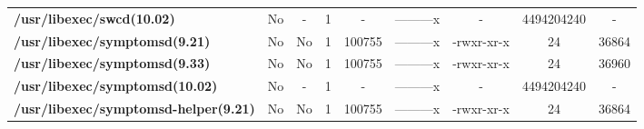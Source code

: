 \begin{center}
{\begin{tabular}{|>{\bfseries} l | C | C | C | C | C | C | C | C |}
					/usr/libexec/swcd(10.02) & No & - & 1 & - & ---------x & - & 4494204240 & -\\ 
					/usr/libexec/symptomsd(9.21) & No & No & \color{green}1 & \color{red}100755 & \color{green}---------x & \color{red}-rwxr-xr-x & \color{green}24 & \color{red}36864\\ 
					/usr/libexec/symptomsd(9.33) & No & No & \color{green}1 & \color{red}100755 & \color{green}---------x & \color{red}-rwxr-xr-x & \color{green}24 & \color{red}36960\\ 
					/usr/libexec/symptomsd(10.02) & No & - & 1 & - & ---------x & - & 4494204240 & -\\ 
					/usr/libexec/symptomsd-helper(9.21) & No & No & \color{green}1 & \color{red}100755 & \color{green}---------x & \color{red}-rwxr-xr-x & \color{green}24 & \color{red}36864\\ 

			\end{tabular}
		}
	\end{center}



